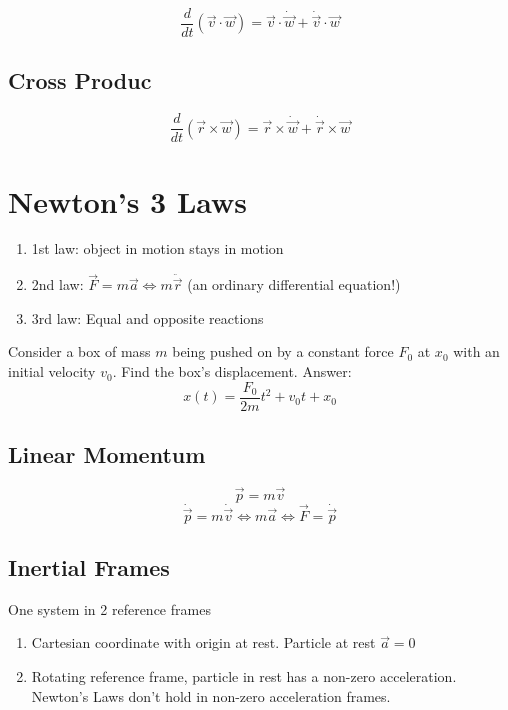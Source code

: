 \documentclass{article}
\newtheorem{one minute paper}[theorem]{One Minute Paper}
\begin{document}
\begin{equation}
    \frac{d}{dt}(\vec{v} \cdot \vec{w}) = \vec{v} \cdot \dot{\vec{w}} + \dot{\vec{v}} \cdot \vec{w}
\end{equation}

\subsection*{Cross Produc}

\begin{equation}
    \frac{d}{dt}(\vec{r} \times \vec{w}) = \vec{r} \times \dot{\vec{w}} + \dot{\vec{r}} \times \vec{w}
\end{equation}

\section*{Newton's 3 Laws}
\begin{enumerate}
    \item 1st law: object in motion stays in motion
    \item 2nd law: $\vec{F} = m\vec{a} \iff m\ddot{\vec{r}}$ (an ordinary differential equation!) 
    \item 3rd law: Equal and opposite reactions
\end{enumerate}

Consider a box of mass $m$ being pushed on by a constant force $F_0$ at $x_0$ with an initial velocity $v_0$. Find the box's displacement. Answer:
\begin{equation}
    x(t) = \frac{F_0}{2m}t^2 + v_0t + x_0
\end{equation}

\subsection*{Linear Momentum}
\begin{equation}
    \vec{p} = m\vec{v}
\end{equation}
\begin{equation}
    \dot{\vec{p}} = m\dot{\vec{v}} \iff m\vec{a} \iff \vec{F} = \dot{\vec{p}}
\end{equation}

\subsection*{Inertial Frames}
One system in 2 reference frames
\begin{enumerate}
    \item Cartesian coordinate with origin at rest. Particle at rest $\vec{a} = 0$
    \item Rotating reference frame, particle in rest has a non-zero acceleration. Newton's Laws don't hold in non-zero acceleration frames.  
\end{enumerate}
\end{document}
